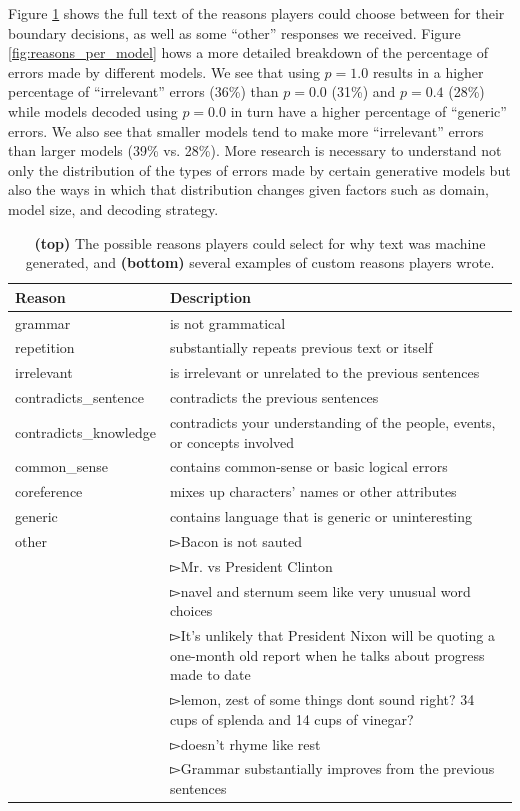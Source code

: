 Figure \ref{tab:reasons_text} shows the full text of the reasons players could choose between for their boundary decisions, as well as some ``other'' responses we received. 
Figure \ref{fig:reasons_per_model} hows a more detailed breakdown of the percentage of errors made by different models. We see that using $p=1.0$ results in a higher percentage of ``irrelevant'' errors (36\%) than $p=0.0$ (31\%) and $p=0.4$ (28\%) while models decoded using $p=0.0$ in turn have a higher percentage of ``generic'' errors. We also see that smaller models tend to make more ``irrelevant'' errors than larger models (39\% vs. 28\%).
More research is necessary to understand not only the distribution of the types of errors made by certain generative models but also the ways in which that distribution changes given factors such as domain, model size, and decoding strategy.

\begin{table}[tb]
    \centering
    \small
    \begin{tabular}{l|p{30em}}
    \toprule
    Reason & Description \\
    \midrule
    grammar &  is not grammatical \\
    repetition & substantially repeats previous text or itself \\
    irrelevant & is irrelevant or unrelated to the previous sentences \\
    contradicts\_sentence & contradicts the previous sentences \\
    contradicts\_knowledge & contradicts your understanding of the people, events, or concepts involved \\
    common\_sense & contains common-sense or basic logical errors \\
    coreference & mixes up characters' names or other attributes \\
    generic & contains language that is generic or uninteresting \\
    \midrule
    other & $\whitepointerright$Bacon is not sauted \\
     & $\whitepointerright$Mr. vs President Clinton \\
     & $\whitepointerright$navel and sternum seem like very unusual word choices \\
     & $\whitepointerright$It's unlikely that President Nixon will be quoting a one-month old report when he talks about progress made to date   \\
     & $\whitepointerright$lemon, zest of some things dont sound right? 34 cups of splenda and 14 cups of vinegar? \\
     & $\whitepointerright$doesn't rhyme like rest \\
     & $\whitepointerright$Grammar substantially improves from the previous sentences \\
    \bottomrule
    \end{tabular}
    \caption{\textbf{(top)} The possible reasons players could select for why text was machine generated, and \textbf{(bottom)} several examples of custom reasons players wrote.}
    \label{tab:reasons_text}
\end{table}

